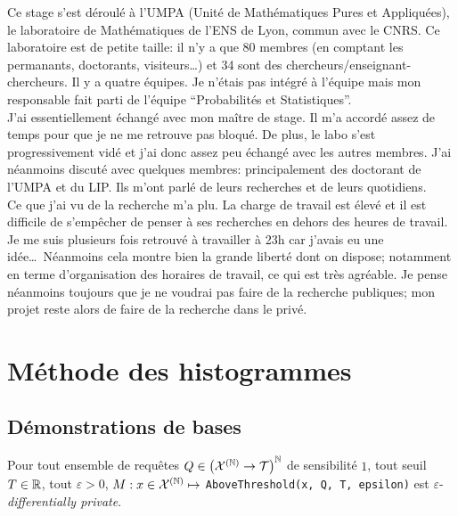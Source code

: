 Ce stage s'est déroulé à l'UMPA (Unité de Mathématiques Pures et Appliquées), le laboratoire de Mathématiques de l'ENS de Lyon, commun avec le CNRS. Ce laboratoire est de petite taille: il n'y a que 80 membres (en comptant les permanants, doctorants, visiteurs\dots) et 34 sont des chercheurs/enseignant-chercheurs. Il y a quatre équipes. Je n'étais pas intégré à l'équipe mais mon responsable fait parti de l'équipe ``Probabilités et Statistiques''.\\

J'ai essentiellement échangé avec mon maître de stage. Il m'a accordé assez de temps pour que je ne me retrouve pas bloqué. De plus, le labo s'est progressivement vidé et j'ai donc assez peu échangé avec les autres membres. J'ai néanmoins discuté avec quelques membres: principalement des doctorant de l'UMPA et du LIP. Ils m'ont parlé de leurs recherches et de leurs quotidiens.\\

Ce que j'ai vu de la recherche m'a plu. La charge de travail est élevé et il est difficile de s’empêcher de penser à ses recherches en dehors des heures de travail. Je me suis plusieurs fois retrouvé à travailler à 23h car j'avais eu une idée\dots\ Néanmoins cela montre bien la grande liberté dont on dispose; notamment en terme d'organisation des horaires de travail, ce qui est très agréable. Je pense néanmoins toujours que je ne voudrai pas faire de la recherche publiques; mon projet reste alors de faire de la recherche dans le privé.

\section{Méthode des histogrammes}

\subsection{Démonstrations de bases}

\begin{theorem}
    \label{dem1}
    Pour tout ensemble de requêtes \(Q \in \left( \mathcal X^{(\mathbb{N})} \to  \mathcal T \right)^{\mathbb{N}}\) de sensibilité \(1\), tout seuil \(T \in \mathbb{R}\), tout \(\varepsilon > 0\), \(M : x \in \mathcal X^{(\mathbb{N})} \mapsto \) \texttt{AboveThreshold(x, Q, T, epsilon)} est \(\varepsilon\)-\textit{differentially private}.
\end{theorem}


